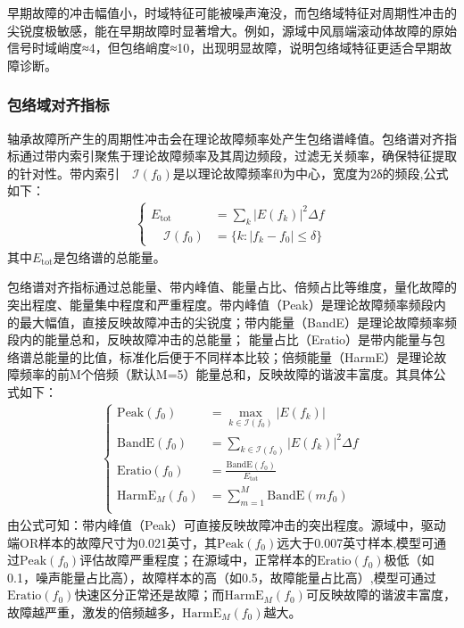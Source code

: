 \documentclass[a4paper]{CPIPC}
\numberwithin{equation}{section}
\begin{document}
早期故障的冲击幅值小，时域特征可能被噪声淹没，而包络域特征对周期性冲击的尖锐度极敏感，能在早期故障时显著增大。例如，源域中风扇端滚动体故障的原始信号时域峭度≈4，但包络峭度≈10，出现明显故障，说明包络域特征更适合早期故障诊断。

\subsubsection{包络域对齐指标}
轴承故障所产生的周期性冲击会在理论故障频率处产生包络谱峰值。包络谱对齐指标通过带内索引聚焦于理论故障频率及其周边频段，过滤无关频率，确保特征提取的针对性。带内索引$\quad \mathcal{I}(f_0)$是以理论故障频率f0为中心，宽度为2δ的频段,公式如下：
\begin{align}
    \left\{
    \begin{aligned}
     E_{\text{tot}} &= \sum_{k} |E(f_k)|^2 \Delta f\\
     \quad \mathcal{I}(f_0) &= \{ k : |f_k - f_0| \leq \delta \}     
    \end{aligned} 
    \right.
\end{align}
其中$E_{\text{tot}}$是包络谱的总能量。

包络谱对齐指标通过总能量、带内峰值、能量占比、倍频占比等维度，量化故障的突出程度、能量集中程度和严重程度。带内峰值（Peak）是理论故障频率频段内的最大幅值，直接反映故障冲击的尖锐度；带内能量（BandE）是理论故障频率频段内的能量总和，反映故障冲击的总能量；
能量占比（Eratio）是带内能量与包络谱总能量的比值，标准化后便于不同样本比较；倍频能量（HarmE）是理论故障频率的前M个倍频（默认M=5）能量总和，反映故障的谐波丰富度\cite{ref4}。其具体公式如下：
\begin{align}
    \left\{
    \begin{aligned}
    \text{Peak}(f_0) &= \max_{k \in \mathcal{I}(f_0)} |E(f_k)|\\
    \text{BandE}(f_0) &= \sum_{k \in \mathcal{I}(f_0)} |E(f_k)|^2 \Delta f\\
    \text{Eratio}(f_0) &= \frac{\text{BandE}(f_0)}{E_{\text{tot}}}\\
    \text{HarmE}_M(f_0) &= \sum_{m=1}^{M} \text{BandE}(mf_0)\\
    \end{aligned} 
    \right.
\end{align}
由公式可知：带内峰值（Peak）可直接反映故障冲击的突出程度。源域中，驱动端OR样本的故障尺寸为0.021英寸，其$\text{Peak}(f_0)$远大于0.007英寸样本,模型可通过$\text{Peak}(f_0)$评估故障严重程度；在源域中，正常样本的$\text{Eratio}(f_0)$极低（如0.1，噪声能量占比高），故障样本的高（如0.5，故障能量占比高）,模型可通过$\text{Eratio}(f_0)$快速区分正常还是故障；而$\text{HarmE}_M(f_0)$可反映故障的谐波丰富度，故障越严重，激发的倍频越多，$\text{HarmE}_M(f_0)$越大。
\end{document}
